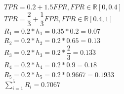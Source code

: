 \documentclass[12pt]{article}
\begin{document}
\begin{center}

$TPR=0.2+1.5FPR, FPR\in \mathbb{R}[0,0.4]$\\
\bigskip
$TPR=\dfrac{2}{3}+\dfrac{1}{3}FPR, FPR\in \mathbb{R}[0.4,1]$\\
\bigskip
$R_{1}=0.2*h_{1}=0.35*0.2=0.07$\\
\bigskip
$R_{2}=0.2*h_{2}=0.2*0.65=0.13$\\
\bigskip
$R_{3}=0.2*h_{3}=0.2*\dfrac{2}{3}=0.1\bar{33}$\\
\bigskip
$R_{4}=0.2*h_{4}=0.2*0.9=0.18$\\
\bigskip
$R_{5}=0.2*h_{5}=0.2*0.9667=0.19\bar{33}$\\
\bigskip
$\displaystyle \sum_{i=1}^{5}R_{i}=0.7067$\\

\end{center}
\end{document}
